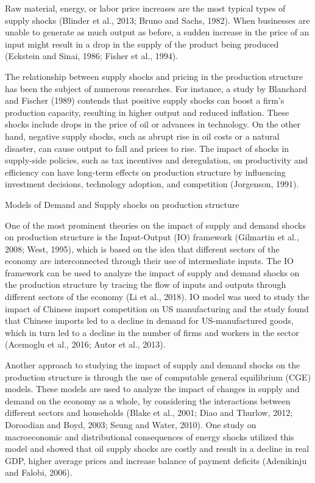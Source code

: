 \documentclass[11pt]{article}
\begin{document}
Raw material, energy, or labor price increases are the most typical
types of supply shocks (Blinder et al., 2013; Bruno and Sachs, 1982).
When businesses are unable to generate as much output as before, a
sudden increase in the price of an input might result in a drop in the
supply of the product being produced (Eckstein and Sinai, 1986; Fisher
et al., 1994).

The relationship between supply shocks and pricing in the production
structure has been the subject of numerous researches. For instance, a
study by Blanchard and Fischer (1989) contends that positive supply
shocks can boost a firm's production capacity, resulting in higher
output and reduced inflation. These shocks include drops in the price of
oil or advances in technology. On the other hand, negative supply
shocks, such as abrupt rise in oil costs or a natural disaster, can
cause output to fall and prices to rise. The impact of shocks in
supply-side policies, such as tax incentives and deregulation, on
productivity and efficiency can have long-term effects on production
structure by influencing investment decisions, technology adoption, and
competition (Jorgenson, 1991).

Models of Demand and Supply shocks on production structure

One of the most prominent theories on the impact of supply and demand
shocks on production structure is the Input-Output (IO) framework
(Gilmartin et al., 2008; West, 1995), which is based on the idea that
different sectors of the economy are interconnected through their use of
intermediate inputs. The IO framework can be used to analyze the impact
of supply and demand shocks on the production structure by tracing the
flow of inputs and outputs through different sectors of the economy (Li
et al., 2018). IO model was used to study the impact of Chinese import
competition on US manufacturing and the study found that Chinese imports
led to a decline in demand for US-manufactured goods, which in turn led
to a decline in the number of firms and workers in the sector (Acemoglu
et al., 2016; Autor et al., 2013).

Another approach to studying the impact of supply and demand shocks on
the production structure is through the use of computable general
equilibrium (CGE) models. These models are used to analyze the impact of
changes in supply and demand on the economy as a whole, by considering
the interactions between different sectors and households (Blake et al.,
2001; Diao and Thurlow, 2012; Doroodian and Boyd, 2003; Seung and Water,
2010). One study on macroeconomic and distributional consequences of
energy shocks utilized this model and showed that oil supply shocks are
costly and result in a decline in real GDP, higher average prices and
increase balance of payment deficits (Adenikinju and Falobi, 2006).
\end{document}
